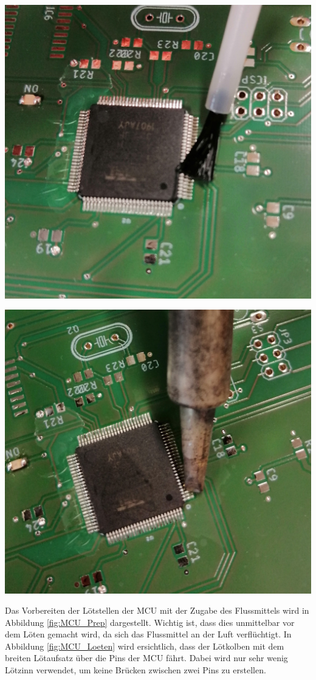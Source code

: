 {\begin{minipage}[b][8cm][t]{0.49\textwidth}
\centering
\includegraphics[width=0.9\linewidth]{graphics/HW_Val/MCU_Prep.jpg}
\label{fig:MCU_Prep}
\end{minipage}}
{\begin{minipage}[b][8cm][t]{0.49\textwidth}
\centering
\includegraphics[width=0.9\linewidth]{graphics/HW_Val/MCU_Loeten.jpg}
\label{fig:MCU_Loeten}
\end{minipage}}
\newpage
Das Vorbereiten der Lötstellen der MCU mit der Zugabe des Flussmittels wird in Abbildung \ref{fig:MCU_Prep} dargestellt. Wichtig ist, dass dies unmittelbar vor dem Löten gemacht wird, da sich das Flussmittel an der Luft verflüchtigt. In Abbildung \ref{fig:MCU_Loeten} wird ersichtlich, dass der Lötkolben mit dem breiten Lötaufsatz über die Pins der MCU fährt. Dabei wird nur sehr wenig Lötzinn verwendet, um keine Brücken zwischen zwei Pins zu erstellen.

